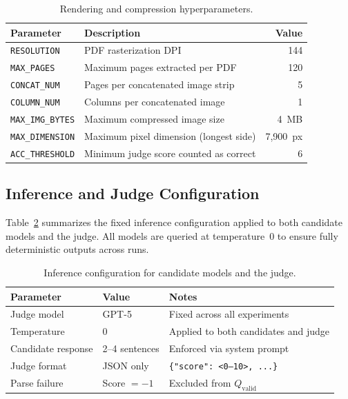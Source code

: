 \documentclass{article} %
\begin{document}
\begin{table}[htbp]
\centering
\small
\caption{Rendering and compression hyperparameters.}
\label{tab:rendering_appendix}
\begin{tabular}{llr}
\toprule
\textbf{Parameter} & \textbf{Description} & \textbf{Value} \\
\midrule
\texttt{RESOLUTION}      & PDF rasterization DPI                     & 144 \\
\texttt{MAX\_PAGES}      & Maximum pages extracted per PDF           & 120 \\
\texttt{CONCAT\_NUM}     & Pages per concatenated image strip        & 5   \\
\texttt{COLUMN\_NUM}     & Columns per concatenated image            & 1   \\
\texttt{MAX\_IMG\_BYTES} & Maximum compressed image size             & 4~MB \\
\texttt{MAX\_DIMENSION}  & Maximum pixel dimension (longest side)    & 7{,}900~px \\
\texttt{ACC\_THRESHOLD}  & Minimum judge score counted as correct    & 6   \\
\bottomrule
\end{tabular}
\end{table}

\subsection{Inference and Judge Configuration}
\label{app:inference_details}

Table~\ref{tab:inference_appendix} summarizes the fixed inference configuration applied
to both candidate models and the judge. All models are queried at temperature~0 to
ensure fully deterministic outputs across runs.

\begin{table}[htbp]
\centering
\small
\caption{Inference configuration for candidate models and the judge.}
\label{tab:inference_appendix}
\begin{tabular}{llp{7cm}}
\toprule
\textbf{Parameter} & \textbf{Value} & \textbf{Notes} \\
\midrule
Judge model        & GPT-5          & Fixed across all experiments \\
Temperature        & 0              & Applied to both candidates and judge \\
Candidate response & 2--4 sentences & Enforced via system prompt \\
Judge format       & JSON only      & \texttt{\{"score": <0--10>, ...\}} \\
Parse failure      & Score $= -1$   & Excluded from $Q_{\mathrm{valid}}$ \\
\bottomrule
\end{tabular}
\end{table}
\end{document}
